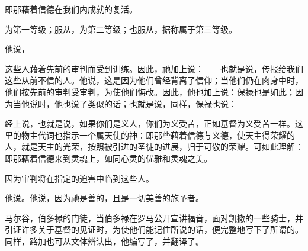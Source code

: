 即那藉着信德在我们内成就的复活。\par

为第一等级；服从，为第二等级；也服从，据称属于第三等级。\par

他说，\par

这些人藉着先前的审判而受到训练。因此，祂加上说：——也就是说，传报给我们这些从前不信的人。他说，这是因为他们曾经背离了信仰；当他们仍在肉身中时，他们按先前的审判受审判，为使他们悔改。因此，他也加上说：保禄也是如此；因为当他说时，他也说了类似的话；也就是说，同样，保禄也说：\par

经上说，也就是说，如果你们是义人，你们为义受苦，正如基督为义受苦一样。这里的物主代词也指示一个属天使的神：即那些藉着信德与义德，使天主得荣耀的人，就是天主的光荣，按照被引进的圣徒的进展，归于可敬的荣耀。可如此理解：即那藉着信德来到灵魂上，如同心灵的优雅和灵魂之美。\par

因为审判将在指定的迫害中临到这些人。\par

他说。他说，因为祂是善的，且是一切美善的施予者。\par

马尔谷，伯多禄的门徒，当伯多禄在罗马公开宣讲福音，面对凯撒的一些骑士，并引证许多关于基督的见证时，为使他们能记住所说的话，便完整地写下了所谓的。同样，路加也可从文体辨认出，他编写了，并翻译了。\par


